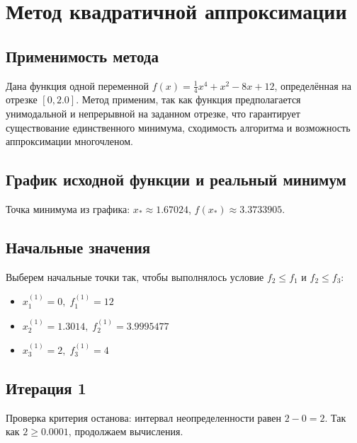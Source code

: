 \documentclass[12pt]{article}
\begin{document}
\section{Метод квадратичной аппроксимации}
\subsection{Применимость метода}
Дана функция одной переменной \( f(x) = \frac{1}{4}x^4+x^2-8x+12 \), определённая на отрезке \( [0, 2.0] \).
Метод применим, так как функция предполагается унимодальной и непрерывной на заданном отрезке, что гарантирует существование единственного минимума, сходимость алгоритма и возможность аппроксимации многочленом.
\subsection{График исходной функции и реальный минимум}
Точка минимума из графика: \( x_* \approx 1.67024 \), \( f(x_*) \approx 3.3733905 \).
\begin{center}
\end{center}
\subsection{Начальные значения}
Выберем начальные точки так, чтобы выполнялось условие \( f_2 \le f_1 \) и \( f_2 \le f_3 \):
\begin{itemize}
  \item \( x_1^{(1)} = 0, \; f_1^{(1)} = 12 \)
  \item \( x_2^{(1)} = 1.3014, \; f_2^{(1)} = 3.9995477 \)
  \item \( x_3^{(1)} = 2, \; f_3^{(1)} = 4 \)
\end{itemize}
\subsection{Итерация 1}
Проверка критерия останова: интервал неопределенности равен \( 2 - 0 = 2 \).
Так как \( 2 \ge 0.0001 \), продолжаем вычисления.
\end{document}
